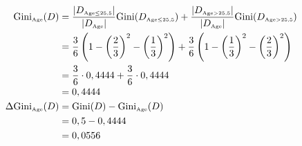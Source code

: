 \documentclass[
english,
smallborders
]{i6prcsht}
\newcommand{\OfSpecificValue}[3]{_{\text{\tiny #1#2#3}}}
\newcommand{\OfAttribute}[1]{_{\text{\tiny #1}}}
\begin{document}
\begin{solution}
\begin{enumerate}
\begin{enumerate}
\begin{enumerate}
\begin{enumerate}
					                        \begin{alignat*}{2}
						                        \text{Gini}\OfAttribute{Age}(D)       & = \frac{|D\OfSpecificValue{Age}{$\leq$}{25,5}|}{|D\OfAttribute{Age}|} \text{Gini}(D\OfSpecificValue{Age}{$\leq$}{25,5}) + \frac{|D\OfSpecificValue{Age}{$>$}{25,5}|}{|D\OfAttribute{Age}|} \text{Gini}(D\OfSpecificValue{Age}{$>$}{25,5}) \\
						                                                              & = \frac{3}{6} \left(1 - \left(\frac{2}{3}\right)^2 - \left(\frac{1}{3}\right)^2\right) + \frac{3}{6} \left(1 - \left(\frac{1}{3}\right)^2 - \left(\frac{2}{3}\right)^2\right)                                                             \\
						                                                              & = \frac{3}{6} \cdot 0,4444 + \frac{3}{6} \cdot 0,4444                                                                                                                                                                                     \\
						                                                              & = 0,4444                                                                                                                                                                                                                                  \\
						                        \Delta\text{Gini}\OfAttribute{Age}(D) & = \text{Gini}(D) - \text{Gini}\OfAttribute{Age}(D)                                                                                                                                                                                        \\
						                                                              & = 0,5 - 0,4444                                                                                                                                                                                                                            \\
						                                                              & = 0,0556                                                                                                                                                                                                                                  \\
					                        \end{alignat*}
				                  \end{enumerate}


\end{enumerate}
\end{enumerate}
\end{enumerate}
\end{solution}
\end{document}
